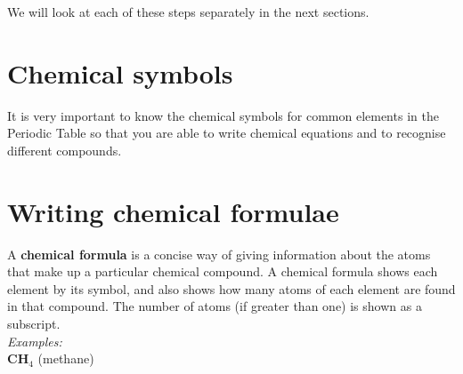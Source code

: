 We will look at each of these steps separately in the next sections.



\section{Chemical symbols}
\label{sec:repchange:symbols}

It is very important to know the chemical symbols for common elements in the Periodic Table so that you are able to write chemical equations and to recognise different compounds.







\section{Writing chemical formulae}
\label{sec:repchange:formulae}

A \textbf{chemical formula} is a concise way of giving information about 
the atoms that make up a particular chemical compound. A chemical formula shows each element by its symbol, and also shows 
how many atoms of each element are found in that compound. The number of atoms (if greater than one) is 
shown as a subscript.\\

\textit{Examples:}\\

\textbf{CH$_4$} (methane)

